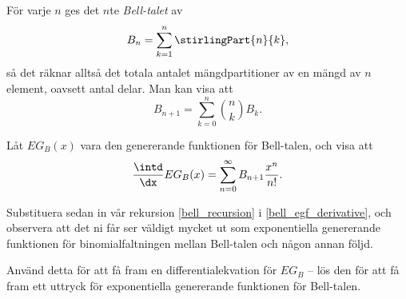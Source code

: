 \documentclass[nobib]{tufte-handout}
\begin{document}
\begin{xca}
  För varje $n$ ges det $n$te \emph{Bell-talet} av
  $$B_n = \sum_{k=1}^{n} \stirlingPart{n}{k},$$
  så det räknar alltså det totala antalet mängdpartitioner av en mängd av $n$ element, oavsett antal delar. Man kan visa att
  \begin{equation}\label{bell_recursion}
    B_{n+1} = \sum_{k=0}^{n} \binom{n}{k} B_k.
  \end{equation}

  Låt $EG_B(x)$ vara den genererande funktionen för Bell-talen, och visa att
  \begin{equation}\label{bell_egf_derivative}
    \frac{\intd}{\dx} EG_B(x) = \sum_{n=0}^{\infty} B_{n+1}\frac{x^n}{n!}.
  \end{equation}

  Substituera sedan in vår rekursion \eqref{bell_recursion} i \eqref{bell_egf_derivative}, och observera att det ni får ser väldigt mycket ut som exponentiella genererande funktionen för binomialfaltningen mellan Bell-talen och någon annan följd.

  Använd detta för att få fram en differentialekvation för $EG_B$ -- lös den för att få fram ett uttryck för exponentiella genererande funktionen för Bell-talen.
\end{xca}

%
%
\end{document}
